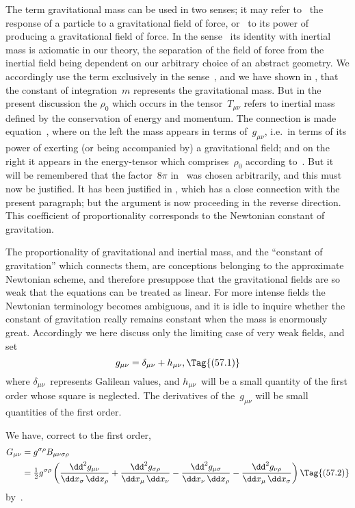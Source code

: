 \documentclass[12pt]{book}
\begin{document}
The term gravitational mass can be used in two senses; it may refer to
~the response of a particle to a gravitational field of force, or ~to its
power of producing a gravitational field of force. In the sense~ its identity
with inertial mass is axiomatic in our theory, the separation of the field of
force from the inertial field being dependent on our arbitrary choice of
an abstract geometry. We accordingly use the term exclusively in the sense~,
and we have shown in ,  that the constant of integration~$m$ represents
the gravitational mass. But in the present discussion the $\rho_{0}$ which
occurs in the tensor~$T_{\mu\nu}$ refers to inertial mass defined by the conservation of
energy and momentum. The connection is made  equation~, where
on the left the mass appears in terms of~$g_{\mu\nu}$, i.e.\ in terms of its power of
exerting (or being accompanied by) a gravitational field; and on the right it
appears in the energy-tensor which comprises~$\rho_{0}$ according to~. But it
will be remembered that the factor~$8\pi$ in~ was chosen arbitrarily, and
this must now be justified\footnotemark.\footnotetext
  {It has been justified in , which has a close connection with the present paragraph; but
  the argument is now proceeding in the reverse direction.}
This coefficient of proportionality corresponds to
the Newtonian constant of gravitation.

The proportionality of gravitational and inertial mass, and the ``constant
of gravitation'' which connects them, are conceptions belonging to the approximate
Newtonian scheme, and therefore presuppose that the gravitational
fields are so weak that the equations can be treated as linear. For more
intense fields the Newtonian terminology becomes ambiguous, and it is idle
to inquire whether the constant of gravitation really remains constant when
the mass is enormously great. Accordingly we here discuss only the limiting
case of very weak fields, and set
\[
g_{\mu\nu} = \delta_{\mu\nu} + h_{\mu\nu},
\Tag{(57.1)}
\]
where $\delta_{\mu\nu}$~represents Galilean values, and $h_{\mu\nu}$~will be a small quantity of the
first order whose square is neglected. The derivatives of the~$g_{\mu\nu}$ will be small
quantities of the first order.

We have, correct to the first order,
\begin{align*}
  G_{\mu\nu}
  &= g^{\sigma\rho} B_{\mu\nu\sigma\rho} \\
  &= \tfrac{1}{2}g^{\sigma\rho} \left(
    \frac{\dd^{2} g_{\mu\nu}}{\dd x_{\sigma}\, \dd x_{\rho}}
  + \frac{\dd^{2} g_{\sigma\rho}}{\dd x_{\mu}\, \dd x_{\nu}}
  - \frac{\dd^{2} g_{\mu\sigma}}{\dd x_{\nu}\, \dd x_{\rho}}
  - \frac{\dd^{2} g_{\nu\rho}}{\dd x_{\mu}\, \dd x_{\sigma}}\right)
\Tag{(57.2)}
\end{align*}
by~.
\end{document}

